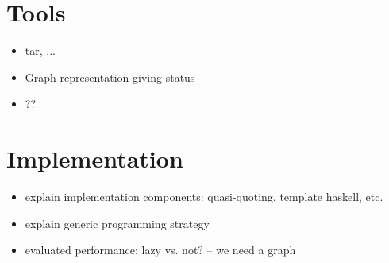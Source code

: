 \documentclass[nocopyrightspace,natbib]{sigplanconf}
\begin{document}
\section{Tools}
\label{sec:tools}
\begin{itemize}
\item tar, ...
\item Graph representation giving status
\item ??
\end{itemize}


\section{Implementation}

\begin{itemize}
\item explain implementation components: quasi-quoting, template haskell, etc.
\item explain generic programming strategy
\item evaluated performance: lazy vs. not? -- we need a graph
\end{itemize}
\end{document}
